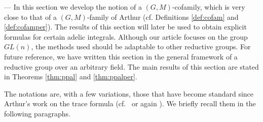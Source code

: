\begin{paragr}[Introduction.] ---\label{S:notations} In this section we develop the notion of a $(G,M)$-cofamily, which is very close to that of a $(G,M)$-family of Arthur (cf. Definitions \ref{def:cofam} and \ref{def:cofamper}). The results of this section will later be used to obtain explicit formulas for certain adelic integrals. Although our article focuses on the group $GL(n)$, the methods used should be adaptable to other reductive groups. For future reference, we have written this section in the general framework of a reductive group over an arbitrary field. The main results of this section are stated in Theorems \ref{thm:ppal} and \ref{thm:ppalper}.

  The notations are, with a few variations, those that have become standard since Arthur's work on the trace formula (cf.\ \cite{ar1,trace_inv} or again \cite{ar-intro}). We briefly recall them in the following paragraphs.
\end{paragr}

